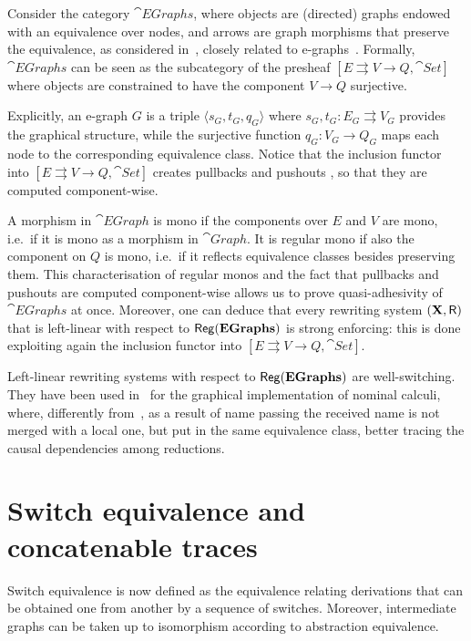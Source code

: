 \begin{example}[E-graphs]
	Consider the category $\cat{EGraphs}$, where objects are (directed)
	graphs endowed with an equivalence over nodes, and arrows are graph
	morphisms that preserve the equivalence, as considered
	in~\cite{BaldanGM06}, closely related to e-graphs~\cite{WNW:egg}. 
	Formally, $\cat{EGraphs}$ can be seen as the
	subcategory of the presheaf
	$[E \rightrightarrows V \to Q, \cat{Set}]$ where objects are
	constrained to have the component $V \to Q$ surjective. 
	
	Explicitly, an
	e-graph $G$ is a triple $\langle s_G, t_G, q_G \rangle$ where
	$s_G, t_G: E_G \rightrightarrows V_G$ provides the graphical
	structure, while the surjective function $q_G : V_G \to Q_G$ maps
	each node to the corresponding equivalence class. 
	Notice that the inclusion functor into  $[E \rightrightarrows V \to Q, \cat{Set}]$ 
	creates pullbacks and pushouts \cite{mac2013categories}, so that they are computed component-wise.
	
	A morphism in $\cat{EGraph}$ is mono if the components over $E$
	and $V$ are mono, i.e.~if it is mono as a morphism in
	$\cat{Graph}$. It is regular mono if also the component on
	$Q$ is mono, i.e.~if it reflects equivalence classes besides
	preserving them. This characterisation of regular monos and the fact that pullbacks and pushouts are computed component-wise allows us to prove quasi-adhesivity of $\cat{EGraphs}$ at once. Moreover, one can deduce that every rewriting system $(\textbf {\textup{X}}, \mathsf{R})$ that is left-linear with respect to $\mathsf{Reg}(\mathbf{EGraphs})$ is strong enforcing: this is done exploiting again the inclusion functor into $[E \rightrightarrows V \to Q, \cat{Set}]$.
	
	Left-linear rewriting systems with respect to $\mathsf{Reg}(\mathbf{EGraphs})$ are well-switching. They have been used in~\cite{BaldanGM06} for the graphical implementation of nominal calculi, where,
	differently from~\cite{Gad07}, as a result of name passing the received name is not merged with a local one, but put in the same equivalence class, better tracing the causal dependencies among reductions.
\end{example}


\section{Switch equivalence and concatenable traces}

Switch equivalence is now defined as the equivalence relating derivations that 
can be obtained one from another by a sequence of switches. Moreover, intermediate graphs can be taken up to isomorphism according to abstraction equivalence.

